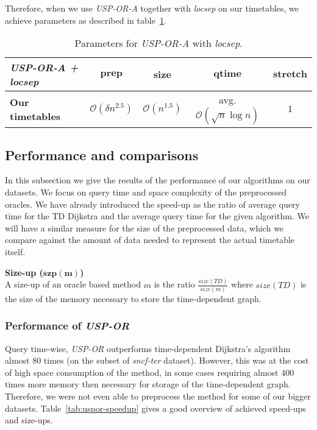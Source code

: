 		\noindent Therefore, when we use \textit{USP-OR-A} together with \textit{locsep} on our timetables, we achieve parameters as described in table~\ref{tab:usporalocsep}.
		
		\begin{table}[h!]
			\centering
			\begin{tabular}{l|c|c|c|c}
				\cellcolor{oracle-clr} \textit{\textbf{USP-OR-A + locsep}} & \cellcolor{oracle-clr} $\bm{prep}$ & \cellcolor{oracle-clr} $\bm{size}$ & \cellcolor{oracle-clr} $\bm{qtime}$ & \cellcolor{oracle-clr} $\bm{stretch}$ \\
				\hline
				\cellcolor{oracle-clr} \textbf{Our timetables} & $\mathcal{O}(\delta n^{2.5})$ & $\mathcal{O}(n^{1.5})$ & avg. $\mathcal{O}(\sqrt{n} \log n)$ & $1$ \\
			\end{tabular}
			\caption{\label{tab:usporalocsep} Parameters for \textit{USP-OR-A} with \textit{locsep}.}
		\end{table}
	
\subsection{Performance and comparisons}

	\noindent In this subsection we give the results of the performance of our algorithms on our datasets. We focus on query time and space complexity of the preprocessed oracles. We have already introduced the speed-up as the ratio of average query time for the TD Dijkstra and the average query time for the given algorithm. We will have a similar measure for the size of the preprocessed data, which we compare against the amount of data needed to represent the actual timetable itself.
	
	\begin{definition}
		\textbf{Size-up ($\bm{szp(m)}$)}\\
		A size-up of an oracle based method $m$ is the ratio $\frac{\displaystyle size(TD)}{\displaystyle size(m)}$ where $size(TD)$ is the size of the memory necessary to store the time-dependent graph.
	\end{definition}

	\subsubsection{Performance of \textit{USP-OR}}
		
		Query time-wise, \textit{USP-OR} outperforms time-dependent Dijkstra's algorithm almost 80 times (on the subset of \textit{sncf-ter} dataset). However, this was at the cost of high space consumption of the method, in some cases requiring almost 400 times more memory then necessary for storage of the time-dependent graph. Therefore, we were not even able to preprocess the method for some of our bigger datasets. Table~\ref{tab:uspor-speedup} gives a good overview of achieved speed-ups and size-ups.
	
